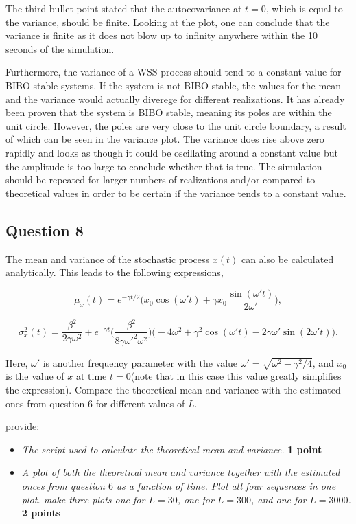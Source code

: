 \documentclass[11pt]{article}
\providecommand{\tightlist}{%
      \setlength{\itemsep}{0pt}\setlength{\parskip}{0pt}}
\begin{document}
The third bullet point stated that the autocovariance at \(t=0\), which
is equal to the variance, should be finite. Looking at the plot, one can
conclude that the variance is finite as it does not blow up to infinity
anywhere within the 10 seconds of the simulation.

Furthermore, the variance of a WSS process should tend to a constant
value for BIBO stable systems. If the system is not BIBO stable, the
values for the mean and the variance would actually diverege for
different realizations. It has already been proven that the system is
BIBO stable, meaning its poles are within the unit circle. However, the
poles are very close to the unit circle boundary, a result of which can
be seen in the variance plot. The variance does rise above zero rapidly
and looks as though it could be oscillating around a constant value but
the amplitude is too large to conclude whether that is true. The
simulation should be repeated for larger numbers of realizations and/or
compared to theoretical values in order to be certain if the variance
tends to a constant value.

    \hypertarget{question-8}{%
\subsection{Question 8}\label{question-8}}

The mean and variance of the stochastic process \(x(t)\) can also be
calculated analytically. This leads to the following expressions,

\[ \mu_x (t) = e^{-\gamma t/2}\bigg( x_0 \cos(\omega' t) + \gamma x_0 \frac{\sin(\omega' t)}{2 \omega'} \bigg), \]

\[ \sigma^2_x (t) = \frac{\beta^2}{2\gamma \omega^2} + e^{-\gamma t} \bigg( \frac{\beta^2}{8\gamma \omega'^2 \omega^2} \bigg)
\big(  -4\omega^2 + \gamma^2 \cos(\omega' t) - 2\gamma \omega' \sin(2 \omega' t)\big). \]

Here, \(\omega'\) is another frequency parameter with the value
\(\omega' = \sqrt{\omega^2-\gamma^2/4}\), and \(x_0\) is the value of
\(x\) at time \(t = 0\)(note that in this case this value greatly
simplifies the expression). Compare the theoretical mean and variance
with the estimated ones from question \(6\) for different values of
\(L\).

provide:

\begin{itemize}
\tightlist
\item
  \emph{The script used to calculate the theoretical mean and variance.}
  \textbf{1 point}
\item
  \emph{A plot of both the theoretical mean and variance together with
  the estimated onces from question \(6\) as a function of time. Plot
  all four sequences in one plot. make three plots one for \(L = 30\),
  one for \(L = 300\), and one for \(L = 3000\).} \textbf{2 points}
\end{itemize}
\end{document}
